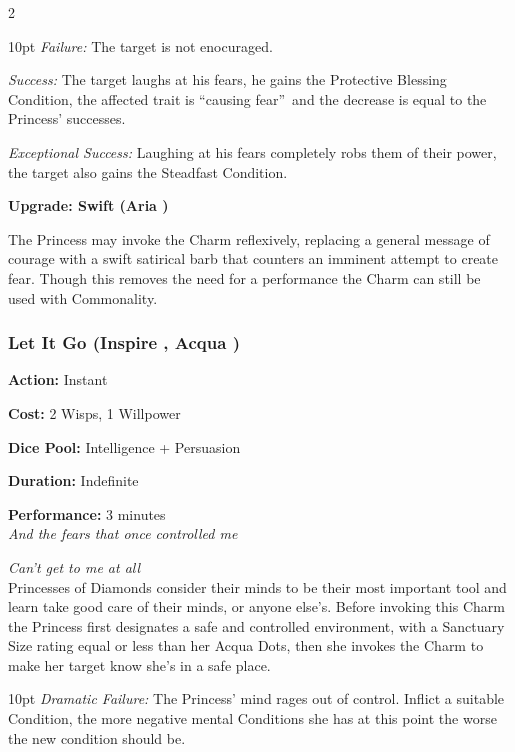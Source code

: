 \begin{multicols}{2}
\begin{myindentpar}{10pt}
    \emph{Failure:} The target is not enocuraged. 

    \emph{Success:} The target laughs at his fears, he gains the Protective Blessing Condition, the affected trait is \textquotedblleft causing fear\textquotedblright\, and the decrease is equal to the Princess' successes.

    \emph{Exceptional Success:} Laughing at his fears completely robs them of their power, the target also gains the Steadfast Condition. 

\textbf{Upgrade: Swift (Aria \textbullet\textbullet)}

The Princess may invoke the Charm reflexively, replacing a general message of courage with a swift satirical barb that counters an imminent attempt to create fear. Though this removes the need for a performance the Charm can still be used with Commonality. \end{myindentpar}

\subsubsection*{Let It Go (Inspire \textbullet\textbullet, Acqua \textbullet\textbullet\textbullet)}

\noindent \textbf{Action:} Instant

\noindent \textbf{Cost:} 2 Wisps, 1 Willpower

\noindent \textbf{Dice Pool:} Intelligence + Persuasion

\noindent \textbf{Duration:} Indefinite

\noindent \textbf{Performance:} 3 minutes \\	

\textit{And the fears that once controlled me}

\textit{Can't get to me at all} \\

\noindent Princesses of Diamonds consider their minds to be their most important tool and learn take good care of their minds, or anyone else's. Before invoking this Charm the Princess first designates a safe and controlled environment, with a Sanctuary Size rating equal or less than her Acqua Dots, then she invokes the Charm to make her target know she's in a safe place. 

\begin{myindentpar}{10pt}    \emph{Dramatic Failure:} The Princess' mind rages out of control. Inflict a suitable Condition, the more negative mental Conditions she has at this point the worse the new condition should be.


\end{myindentpar}
\end{multicols}
